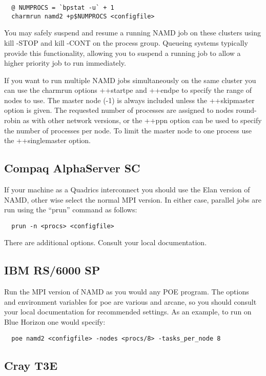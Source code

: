 \begin{verbatim}
  @ NUMPROCS = `bpstat -u` + 1
  charmrun namd2 +p$NUMPROCS <configfile>
\end{verbatim}

You may safely suspend and resume a running NAMD job on these clusters
using kill -STOP and kill -CONT on the process group.  Queueing systems
typically provide this functionality, allowing you to suspend a running
job to allow a higher priority job to run immediately.

If you want to run multiple NAMD jobs simultaneously on the same cluster
you can use the charmrun options ++startpe and ++endpe to specify the
range of nodes to use.  The master node (-1) is always included unless
the ++skipmaster option is given.  The requested number of processes are
assigned to nodes round-robin as with other network versions, or the
++ppn option can be used to specify the number of processes per node.
To limit the master node to one process use the ++singlemaster option.

\subsection{Compaq AlphaServer SC}

If your machine as a Quadrics interconnect you should use the Elan
version of NAMD, other wise select the normal MPI version.  In either
case, parallel jobs are run using the ``prun'' command as follows:

\begin{verbatim}
  prun -n <procs> <configfile>
\end{verbatim}

There are additional options.  Consult your local documentation.

\subsection{IBM RS/6000 SP}

Run the MPI version of NAMD as you would any POE program.  The options
and environment variables for poe are various and arcane, so you should
consult your local documentation for recommended settings.  As an
example, to run on Blue Horizon one would specify:

\begin{verbatim}
  poe namd2 <configfile> -nodes <procs/8> -tasks_per_node 8
\end{verbatim}

\subsection{Cray T3E}


